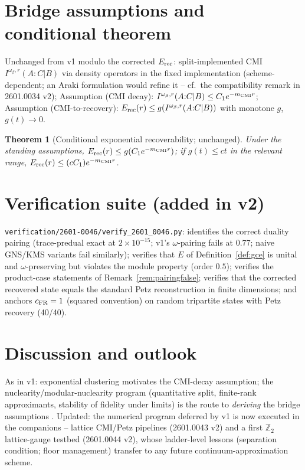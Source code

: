 \documentclass[11pt]{article}
\newtheorem{theorem}{Theorem}[section]
\theoremstyle{remark}
\newcommand{\Erec}{E_{\rm rec}}
\begin{document}
\section{Bridge assumptions and conditional theorem}
\label{sec:bridge}
Unchanged from v1 modulo the corrected $\Erec$: split-implemented CMI
$I^{\omega_\beta, r}(A{:}C|B)$ via density operators in the fixed
implementation (scheme-dependent; an Araki formulation would refine it --
cf.\ the compatibility remark in 2601.0034 v2);
Assumption (CMI decay): $I^{\omega_\beta,r}(A{:}C|B) \le C_1
e^{-m_{\rm CMI} r}$; Assumption (CMI-to-recovery): $\Erec(r) \le
g(I^{\omega_\beta,r}(A{:}C|B))$ with monotone $g$, $g(t)\to0$.
\begin{theorem}[Conditional exponential recoverability; unchanged]
Under the standing assumptions, $\Erec(r) \le g(C_1 e^{-m_{\rm CMI} r})$;
if $g(t) \le ct$ in the relevant range, $\Erec(r) \le (cC_1)
e^{-m_{\rm CMI} r}$.
\end{theorem}

\section{Verification suite (added in v2)}
\texttt{verification/2601-0046/verify\_2601\_0046.py}: identifies the
correct duality pairing (trace-predual exact at $2\times10^{-15}$; v1's
$\omega$-pairing fails at $0.77$; naive GNS/KMS variants fail similarly);
verifies that $E$ of Definition~\ref{def:gce} is unital and
$\omega$-preserving but violates the module property (order $0.5$);
verifies the product-case statements of Remark~\ref{rem:pairingfalse};
verifies that the corrected recovered state equals the standard Petz
reconstruction in finite dimensions; and anchors $c_{\rm FR} = 1$
(squared convention) on random tripartite states with Petz recovery
(40/40).

\section{Discussion and outlook}
As in v1: exponential clustering motivates the CMI-decay assumption; the
nuclearity/modular-nuclearity program (quantitative split, finite-rank
approximants, stability of fidelity under limits) is the route to
\emph{deriving} the bridge assumptions \cite{BDL}. Updated: the numerical
program deferred by v1 is now executed in the companions -- lattice
CMI/Petz pipelines (2601.0043 v2) and a first $\mathbb{Z}_2$
lattice-gauge testbed (2601.0044 v2), whose ladder-level lessons
(separation condition; floor management) transfer to any future
continuum-approximation scheme.
\end{document}
